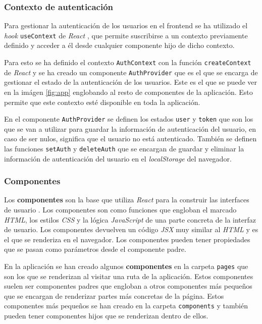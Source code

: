 \subsubsection{Contexto de autenticación} \label{sssec:AuthContext}
Para gestionar la autenticación de los usuarios en el frontend se ha utilizado el
\textit{hook} \texttt{useContext} \cite{use-context} de \textit{React} \cite{react},
que permite suscribirse a un contexto previamente definido y acceder a él desde cualquier
componente hijo de dicho contexto.

Para esto se ha definido el contexto \texttt{AuthContext} con la función
\texttt{createContext} \cite{create-context} de \textit{React} \cite{react} y se ha creado
un componente \texttt{AuthProvider} que es el que se encarga de gestionar el estado de la
autenticación de los usuarios. Este es el que se puede ver en la imágen \ref{fig:app}
englobando al resto de componentes de la aplicación. Esto permite que este contexto esté
disponible en toda la aplicación.

En el componente \texttt{AuthProvider} se definen los estados \texttt{user} y
\texttt{token} que son los que se van a utilizar para guardar la información de
autenticación del usuario, en caso de ser nulos, significa que el usuario no está
autenticado. También se definen las funciones \texttt{setAuth} y \texttt{deleteAuth} que
se encargan de guardar y eliminar la información de autenticación del usuario en el
\textit{localStorage} \cite{local-storage} del navegador.

\subsubsection{Componentes}
Los \textbf{componentes} son la base que utiliza \textit{React} \cite{react} para
la construir las interfaces de usuario \cite{react-component}. Los componentes son como
funciones que engloban el marcado \textit{HTML}, los estilos \textit{CSS} y la lógica
\textit{JavaScript} de una parte concreta de la interfaz de usuario. Los componentes
devuelven un código \textit{JSX} \cite{jsx} muy similar al \textit{HTML} y es el que
se renderiza en el navegador. Los componentes pueden tener propiedades que se pasan
como parámetros desde el componente padre.

En la aplicación se han creado algunos \textbf{componentes} en la carpeta \texttt{pages}
que son los que se renderizan al visitar una ruta de la aplicación. Estos componentes
suelen ser componentes padres que engloban a otros componentes más pequeños que se
encargan de renderizar partes más concretas de la página. Estos componentes más pequeños
se han creado en la carpeta \texttt{components} y también pueden tener componentes hijos
que se renderizan dentro de ellos.

